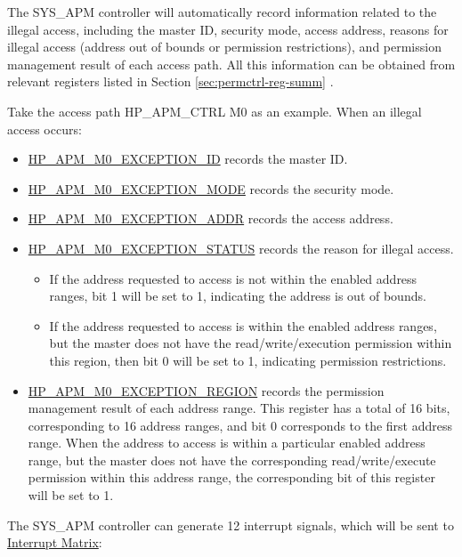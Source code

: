 \documentclass[main\_\_EN.tex]{subfiles}
\begin{document}
The SYS\_APM controller will automatically record information related to the illegal access, including the master ID, security mode, access address, reasons for illegal access (address out of bounds or permission restrictions), and permission management result of each access path. All this information can be obtained from relevant registers listed in Section \ref{sec:permctrl-reg-summ} \textit{}.

Take the access path HP\_APM\_CTRL M0 as an example. When an illegal access occurs:

\begin{itemize}
    \item \hyperref[fielddesc:HPAPMM0EXCEPTIONID]{HP\_APM\_M0\_EXCEPTION\_ID} records the master ID.
    \item \hyperref[fielddesc:HPAPMM0EXCEPTIONMODE]{HP\_APM\_M0\_EXCEPTION\_MODE} records the security mode.
    \item \hyperref[fielddesc:HPAPMM0EXCEPTIONADDR]{HP\_APM\_M0\_EXCEPTION\_ADDR} records the access address.
    \item \hyperref[fielddesc:HPAPMM0EXCEPTIONSTATUS]{HP\_APM\_M0\_EXCEPTION\_STATUS} records the reason for illegal access.
    \begin{itemize}
        \item If the address requested to access is not within the enabled address ranges, bit 1 will be set to 1, indicating the address is out of bounds.
        \item If the address requested to access is within the enabled address ranges, but the master does not have the read/write/execution permission within this region, then bit 0 will be set to 1, indicating permission restrictions.
    \end{itemize}

    \item \hyperref[fielddesc:HPAPMM0EXCEPTIONREGION]{HP\_APM\_M0\_EXCEPTION\_REGION} records the permission management result of each address range. This register has a total of 16 bits, corresponding to 16 address ranges, and bit 0 corresponds to the first address range. When the address to access is within a particular enabled address range, but the master does not have the corresponding read/write/execute permission within this address range, the corresponding bit of this register will be set to 1.

\end{itemize}

The SYS\_APM controller can generate 12 interrupt signals, which will be sent to \hyperref[mod:intmtrx]{Interrupt Matrix}:
\end{document}
